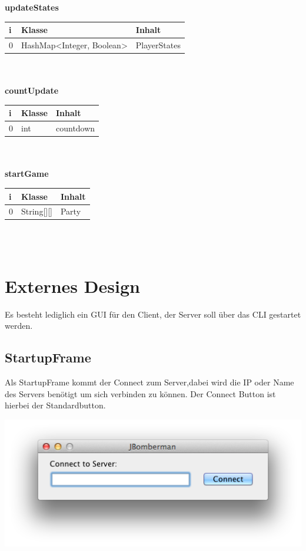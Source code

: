 \documentclass[11pt]{scrartcl}
\begin{document}
\textbf{updateStates}\\

\begin{tabularx}{\linewidth}{l l l}
	\textbf{i} & \textbf{Klasse} & \textbf{Inhalt}\\
	\hline
	0 & HashMap<Integer, Boolean> & PlayerStates\\
\end{tabularx}\\\\

\textbf{countUpdate}\\

\begin{tabularx}{\linewidth}{l l l}
	\textbf{i} & \textbf{Klasse} & \textbf{Inhalt}\\
	\hline
	0 & int & countdown\\
\end{tabularx}\\\\

\textbf{startGame}\\

\begin{tabularx}{\linewidth}{l l l}
	\textbf{i} & \textbf{Klasse} & \textbf{Inhalt}\\
	\hline
	0 & String[][] & Party\\
\end{tabularx}\\\\

\newpage
\section{Externes Design}

Es besteht lediglich ein GUI für den Client, der Server soll über das CLI gestartet werden.
\subsection{StartupFrame}

Als StartupFrame kommt der Connect zum Server,dabei wird die IP oder Name
des Servers benötigt um sich verbinden zu können.
Der Connect Button ist hierbei der Standardbutton.

\includegraphics[scale=0.5]{StartupFrame}
\end{document}
